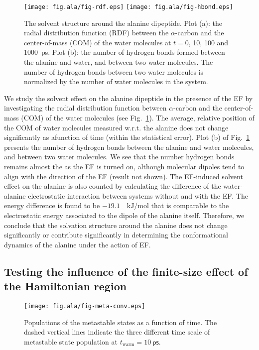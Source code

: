 \documentclass[a4paper,preprint,unsortedaddress,onecolumn]{revtex4-1}
\begin{document}
\begin{figure}
  \centering
  \texttt{[image: fig.ala/fig-rdf.eps]}
  \texttt{[image: fig.ala/fig-hbond.eps]}
  \caption{The solvent structure around the alanine dipeptide.  Plot
    (a): the radial distribution function (RDF) between the
    $\alpha$-carbon and the center-of-mass (COM) of the water molecules at
    $t = 0$, 10, 100 and 1000~ps.  Plot (b): the number of hydrogen
    bonds formed between the alanine and water, and between two water
    molecules.  The number of hydrogen bonds between two water
    molecules is normalized by the number of water molecules in the
    system.}
  \label{fig:tmp7a}
\end{figure}
We study the solvent effect on the alanine dipeptide in the presence of the EF by investigating
the radial distribution function between $\alpha$-carbon and the
center-of-mass (COM) of the water molecules
(see Fig.~\ref{fig:tmp7a}). The average, relative position of the COM of water molecules measured w.r.t.
 the alanine does not change significantly as afunction of time (within the statistical error). Plot (b) of
Fig.~\ref{fig:tmp7a} presents the number of hydrogen bonds between the
alanine and water molecules, and between two water molecules. We see that the
number hydrogen bonds remains almost the as the EF is turned on,
although molecular dipoles tend to align with the direction of the EF (result
not shown). 
The EF-induced solvent effect on the alanine is also counted by calculating the
difference of the water-alanine electrostatic interaction 
between systems without and with the EF.
The energy difference is found to be $-19.1$~~kJ/mol that is
comparable to the electrostatic energy associated to the dipole of the alanine itself.
Therefore, we conclude that the solvation structure around the
alanine does not change significantly or contribute significantly in determining the conformational dynamics of the alanine under the action of EF.






\subsection{Testing the influence of the finite-size effect of the Hamiltonian region}

\begin{figure}
  \centering
  \texttt{[image: fig.ala/fig-meta-conv.eps]}
  \caption{Populations of the metastable states as a function of time.
    The dashed vertical lines indicate the three different time scale of
  metastable state population at $t_{\textrm{warm}} = 10~\textsf{ps}$.}
  \label{fig:tmp7}
\end{figure}
\end{document}
